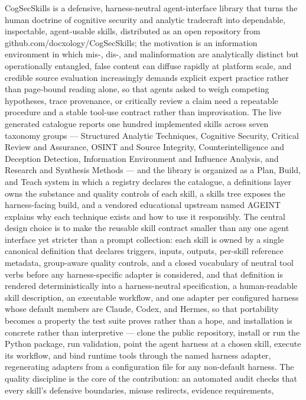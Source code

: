 \documentclass[
]{article}
\begin{document}
CogSecSkills is a defensive, harness-neutral agent-interface library
that turns the human doctrine of cognitive security and analytic
tradecraft into dependable, inspectable, agent-usable skills,
distributed as an open repository from
github.com/docxology/CogSecSkills; the motivation is an information
environment in which mis-, dis-, and malinformation are analytically
distinct but operationally entangled, false content can diffuse rapidly
at platform scale, and credible source evaluation increasingly demands
explicit expert practice rather than page-bound reading alone, so that
agents asked to weigh competing hypotheses, trace provenance, or
critically review a claim need a repeatable procedure and a stable
tool-use contract rather than improvisation. The live generated
catalogue reports one hundred implemented skills across seven taxonomy
groups --- Structured Analytic Techniques, Cognitive Security, Critical
Review and Assurance, OSINT and Source Integrity, Counterintelligence
and Deception Detection, Information Environment and Influence Analysis,
and Research and Synthesis Methods --- and the library is organized as a
Plan, Build, and Teach system in which a registry declares the
catalogue, a definitions layer owns the substance and quality controls
of each skill, a skills tree exposes the harness-facing build, and a
vendored educational upstream named AGEINT explains why each technique
exists and how to use it responsibly. The central design choice is to
make the reusable skill contract smaller than any one agent interface
yet stricter than a prompt collection: each skill is owned by a single
canonical definition that declares triggers, inputs, outputs, per-skill
reference metadata, group-aware quality controls, and a closed
vocabulary of neutral tool verbs before any harness-specific adapter is
considered, and that definition is rendered deterministically into a
harness-neutral specification, a human-readable skill description, an
executable workflow, and one adapter per configured harness whose
default members are Claude, Codex, and Hermes, so that portability
becomes a property the test suite proves rather than a hope, and
installation is concrete rather than interpretive --- clone the public
repository, install or run the Python package, run validation, point the
agent harness at a chosen skill, execute its workflow, and bind runtime
tools through the named harness adapter, regenerating adapters from a
configuration file for any non-default harness. The quality discipline
is the core of the contribution: an automated audit checks that every
skill's defensive boundaries, misuse redirects, evidence requirements,
\end{document}
